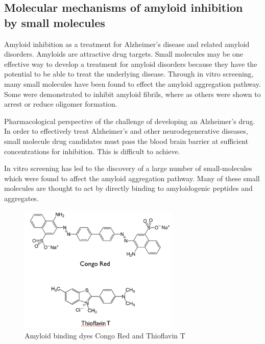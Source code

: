\subsection{Molecular mechanisms of amyloid inhibition 
            \\ by small molecules}
\begin{outline}[enumerate]
    \1 Amyloid inhibition as a treatment for Alzheimer's disease and related amyloid disorders. Amyloids are attractive drug targets. Small molecules may be one effective way to develop a treatment for amyloid disorders because they have the potential to be able to treat the underlying disease. Through in vitro screening, many small molecules have been found to effect the amyloid aggregation pathway.  Some were demonstrated to inhibit amyloid fibrils, where as others were shown to arrest or reduce oligomer formation.   
      
      \2 Pharmacological perspective of the challenge of developing an Alzheimer's drug. In order to effectively treat Alzheimer's and other neurodegenerative diseases, small molecule drug candidates must pass the blood brain barrier at sufficient concentrations for inhibition.  This is difficult to achieve.
      
      \2 In vitro screening has led to the discovery of a large number of small-molecules which were found to affect the amyloid aggregation pathway. Many of these small molecules are thought to act by directly binding to amyloidogenic peptides and aggregates.

      \begin{figure}
        \centering
        \includegraphics[width=3in]{figures/introduction/dyes.png}
        \caption[Small molecule binders]{Amyloid binding dyes Congo Red and Thioflavin T}
        \label{fig:amyloid_dyes}
      \end{figure}
            

\end{outline}
